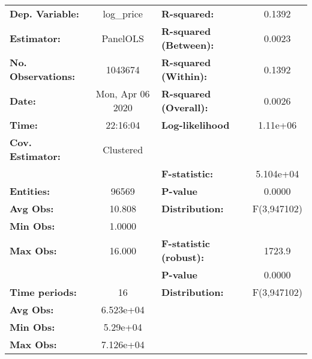 \documentclass{report}
\begin{document}
\begin{center}
\begin{tabular}{lclc}
\toprule
\textbf{Dep. Variable:}        &     log\_price     & \textbf{  R-squared:         }   &      0.1392      \\
\textbf{Estimator:}            &      PanelOLS      & \textbf{  R-squared (Between):}  &      0.0023      \\
\textbf{No. Observations:}     &      1043674       & \textbf{  R-squared (Within):}   &      0.1392      \\
\textbf{Date:}                 &  Mon, Apr 06 2020  & \textbf{  R-squared (Overall):}  &      0.0026      \\
\textbf{Time:}                 &      22:16:04      & \textbf{  Log-likelihood     }   &     1.11e+06     \\
\textbf{Cov. Estimator:}       &     Clustered      & \textbf{                     }   &                  \\
\textbf{}                      &                    & \textbf{  F-statistic:       }   &    5.104e+04     \\
\textbf{Entities:}             &       96569        & \textbf{  P-value            }   &      0.0000      \\
\textbf{Avg Obs:}              &       10.808       & \textbf{  Distribution:      }   &   F(3,947102)    \\
\textbf{Min Obs:}              &       1.0000       & \textbf{                     }   &                  \\
\textbf{Max Obs:}              &       16.000       & \textbf{  F-statistic (robust):} &      1723.9      \\
\textbf{}                      &                    & \textbf{  P-value            }   &      0.0000      \\
\textbf{Time periods:}         &         16         & \textbf{  Distribution:      }   &   F(3,947102)    \\
\textbf{Avg Obs:}              &     6.523e+04      & \textbf{                     }   &                  \\
\textbf{Min Obs:}              &      5.29e+04      & \textbf{                     }   &                  \\
\textbf{Max Obs:}              &     7.126e+04      & \textbf{                     }   &                  \\
\bottomrule
\end{tabular}
\begin{tabular}{lcccccc}

\end{tabular}
\end{center}
\end{document}
